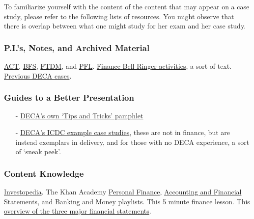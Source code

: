 \documentclass[12pt]{article}
\begin{document}
	To familiarize yourself with the content of the content that may appear on a case study, please refer to the following lists of resources. You might observe that there is overlap between what one might study for her exam and her case study.
	
\subsubsection*{P.I.'s, Notes, and Archived Material}
	
	  \href{http://www.deca.ca/documents/Performance\%20Indicators/ACT.docx}{ACT}, 
	  \href{http://www.deca.ca/documents/Performance\%20Indicators/BFS.docx}{BFS}, 
	  \href{http://www.deca.ca/documents/Performance\%20Indicators/FTDM.docx}{FTDM}, and 
	  \href{http://www.deca.ca/documents/Performance\%20Indicators/PFL.docx}{PFL}.  					\href{ilcollaborate.org/wp-content/uploads/2014/11/Finance-Indicators-Explained.docx}{Finance Bell Ringer activities}, a sort of text. \href{https://saltfleetdeca.commons.hwdsb.on.ca/sample-page/}{Previous DECA cases}.

\subsubsection*{Guides to a Better Presentation}
\begin{itemize}
	\item[-] \href{https://issuu.com/decainc/docs/deca_competitive_events_success}{DECA's own \lq Tips and Tricks' pamphlet}
	\item[-] \href{https://www.deca.org/high-school-programs/competitive-events-sample-videos-hs/}{DECA's ICDC example case studies}, these are not in finance, but are instead exemplars in delivery, and for those with no DECA experience, a sort of \lq sneak peek'.
\end{itemize}

\subsubsection*{Content Knowledge}
	\href{http://www.investopedia.com/}{Investopedia}. The Khan Academy \href{https://www.youtube.com/playlist?list=PL83DF21B47327EDFE}{Personal Finance},  \href{https://www.youtube.com/playlist?list=PLXuBZowfrFgYddDQpXdDtViretdX4ECKS}{Accounting and Financial Statements}, and \href{https://www.youtube.com/playlist?list=PLCECDA315A8848B99}{Banking and Money} playlists. This \href{https://www.youtube.com/watch?v=mhmaHayMha8}{5 minute finance lesson}. This \href{https://www.youtube.com/watch?v=B7300KsDdYY}{overview of the three major financial statements}. 
	
\end{document}
